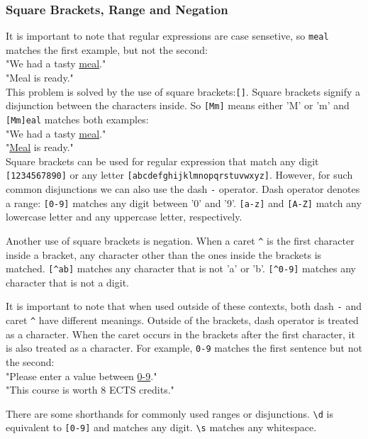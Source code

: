 \subsubsection{Square Brackets, Range and Negation}

It is important to note that regular expressions are case sensetive, so \texttt{meal} matches the first example, but not the second:\\
"We had a tasty \underline{meal}."\\
"Meal is ready."\\
This problem is solved by the use of square brackets:\texttt{[]}.
Square brackets signify a disjunction between the characters inside. 
So \texttt{[Mm]} means either 'M' or 'm' and \texttt{[Mm]eal} matches both examples:\\
"We had a tasty \underline{meal}."\\
"\underline{Meal} is ready."\\
Square brackets can be used for regular expression that match any digit \texttt{[1234567890]} or any letter \texttt{[abcdefghijklmnopqrstuvwxyz]}.
However, for such common disjunctions we can also use the dash \texttt{-} operator.
Dash operator denotes a range: \texttt{[0-9]} matches any digit between '0' and '9'.
\texttt{[a-z]} and \texttt{[A-Z]} match any lowercase letter and any uppercase letter, respectively.

Another use of square brackets is negation. 
When a caret \texttt{\^} is the first character inside a bracket, any character other than the ones inside the brackets is matched.
\texttt{[\^{}ab]} matches any character that is not 'a' or 'b'. 
\texttt{[\^{}0-9]} matches any character that is not a digit.

It is important to note that when used outside of these contexts, both dash \texttt{-} and caret \texttt{\^} have different meanings.
Outside of the brackets, dash operator is treated as a character. 
When the caret occurs in the brackets after the first character, it is also treated as a character.
For example, \texttt{0-9} matches the first sentence but not the second:\\
"Please enter a value between \underline{0-9}."\\
"This course is worth 8 ECTS credits."

There are some shorthands for commonly used ranges or disjunctions.
\texttt{\textbackslash d} is equivalent to \texttt{[0-9]} and matches any digit. 
\texttt{\textbackslash s} matches any whitespace. 

